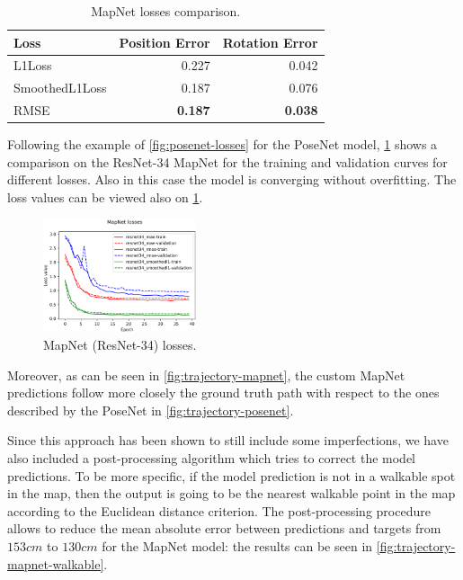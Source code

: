 \begin{table}[htbp]
    \caption{MapNet losses comparison.}
    \begin{center}
        \begin{tabular}{lrr}
            \toprule
            Loss            & {Position Error} & {Rotation Error} \\
            \midrule
            L1Loss          & 0.227            & 0.042            \\
            SmoothedL1Loss  & 0.187            & 0.076            \\
            RMSE            & \textbf{0.187}   & \textbf{0.038}   \\
            \bottomrule
        \end{tabular}
        \label{tab:mapnet-losses}
    \end{center}
\end{table}

Following the example of \cref{fig:posenet-losses} for the PoseNet model, \cref{fig:mapnet-losses} shows a comparison on the ResNet-34 MapNet for the training and validation curves for different losses. Also in this case the model is converging without overfitting. The loss values can be viewed also on \cref{tab:mapnet-losses}.
\begin{figure}[htbp]
    \begin{center}
        \includegraphics[width=0.4\textwidth]{./imgs/mapnet_losses.png}
    \end{center}
    \caption{MapNet (ResNet-34) losses.}
    \label{fig:mapnet-losses}
\end{figure}

Moreover, as can be seen in \cref{fig:trajectory-mapnet}, the custom MapNet predictions follow more closely the ground truth path with respect to the ones described by the PoseNet in \cref{fig:trajectory-posenet}.

Since this approach has been shown to still include some imperfections, we have also included a post-processing algorithm which tries to correct the model predictions. To be more specific, if the model prediction is not in a walkable spot in the map, then the output is going to be the nearest walkable point in the map according to the Euclidean distance criterion. The post-processing procedure allows to reduce the mean absolute error between predictions and targets from $153 cm$ to $130 cm$ for the MapNet model: the results can be seen in \cref{fig:trajectory-mapnet-walkable}.

